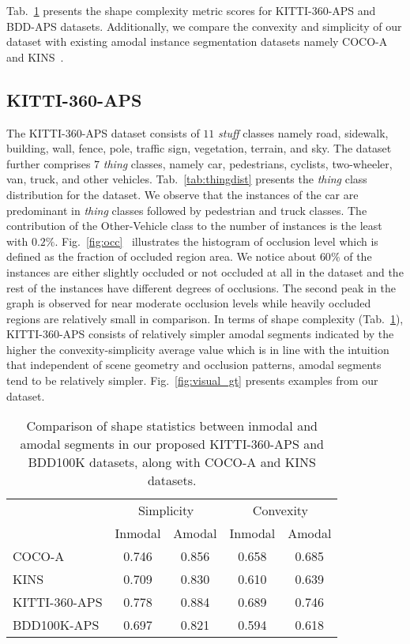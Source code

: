 \documentclass[10pt,twocolumn,letterpaper]{article}
\newcommand{\figref}[1]{Fig.~\ref{#1}}
\newcommand{\tabref}[1]{Tab.~\ref{#1}}
\begin{document}
\tabref{tab:shape} presents the shape complexity metric scores for KITTI-360-APS and BDD-APS datasets. Additionally, we compare the convexity and simplicity of our dataset with existing amodal instance segmentation datasets namely COCO-A~\cite{zhu2017semantic} and KINS~\cite{qi2019amodal}.

\subsection{KITTI-360-APS}

The KITTI-360-APS dataset consists of $11$ \textit{stuff} classes namely road, sidewalk, building, wall, fence, pole, traffic sign, vegetation, terrain, and sky. The dataset further comprises $7$ \textit{thing} classes, namely car, pedestrians, cyclists, two-wheeler, van, truck, and other vehicles. \tabref{tab:thingdist} presents the \textit{thing} class distribution for the dataset. We observe that the instances of the car are predominant in \textit{thing} classes followed by pedestrian and truck classes. The contribution of the Other-Vehicle class to the number of instances is the least with $0.2\%$. \figref{fig:occ}~ illustrates the histogram of occlusion level which is defined as the fraction of occluded region area. We notice about $60\%$ of the instances are either slightly occluded or not occluded at all in the dataset and the rest of the instances have different degrees of occlusions. The second peak in the graph is observed for near moderate occlusion levels while heavily occluded regions are relatively small in comparison. In terms of shape complexity (\tabref{tab:shape}), KITTI-360-APS consists of relatively simpler amodal segments indicated by the higher the convexity-simplicity average value which is in line with the intuition~\cite{zhu2017semantic} that independent of scene geometry and occlusion patterns, amodal segments tend to be relatively simpler. \figref{fig:visual_gt} presents examples from our dataset.

\begin{table}
\centering\small\renewcommand{}
\renewcommand{\tabcolsep}{2mm}
\begin{tabular}{l|cc|cc}
\toprule
 & \multicolumn{2}{c|}{{Simplicity}} & \multicolumn{2}{c}{{Convexity}}\\
\cmidrule{2-5}
 & Inmodal & Amodal & Inmodal & Amodal \\
\midrule
COCO-A~\cite{zhu2017semantic} & 0.746   & 0.856   & 0.658   & 0.685\\
KINS~\cite{qi2019amodal}  & 0.709   & 0.830   & 0.610   & 0.639\\
KITTI-360-APS & 0.778   & 0.884   & 0.689   & 0.746\\
BDD100K-APS  & 0.697   & 0.821   & 0.594   & 0.618\\
\bottomrule
\end{tabular}
\caption{Comparison of shape statistics between inmodal and amodal segments in our proposed KITTI-360-APS and BDD100K datasets, along with COCO-A and KINS datasets.}
\label{tab:shape}
\end{table}
\end{document}
